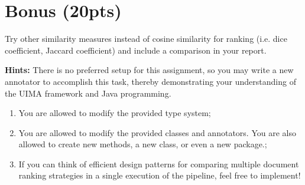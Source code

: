 \documentclass[oneside,11pt]{memoir}
\begin{document}
\chapter*{Bonus (20pts)}
\endgroup

Try other similarity measures instead of cosine similarity for ranking (i.e. dice coefficient, Jaccard
coefficient) and include a comparison in your report.


\textbf{Hints:} There is no preferred setup for this assignment, so you may write a new annotator to accomplish this
task, thereby demonstrating your understanding of the UIMA framework and Java programming.

\begin{enumerate}
\item You are allowed to modify the provided type system;
\item You are allowed to modify the provided classes and annotators. You are also allowed to create new
methods, a new class, or even a new package.;
\item If you can think of efficient design patterns for comparing multiple document ranking strategies in a
single execution of the pipeline, feel free to implement!
\end{enumerate}
\end{document}
